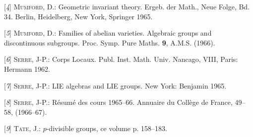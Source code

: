 [\textit{4}] \textsc{Mumford}, D.: Geometric invariant theory. Ergeb. der Math., Neue Folge, Bd. 34. Berlin, Heidelberg, New York, Springer 1965.

[\textit{5}] \textsc{Mumford}, D.: Families of abelian varieties. Algebraic groups and discontinuous subgroups. Proc. Symp. Pure Maths. \textbf{9}, A.M.S. (1966).

[\textit{6}] \textsc{Serre}, J-P.: Corps Locaux. Publ. Inst. Math. Univ. Nancago, VIII, Paris: Hermann 1962.

[\textit{7}] \textsc{Serre}, J-P.: LIE algebras and LIE groups. New York: Benjamin 1965.

[\textit{8}] \textsc{Serre}, J-P.: Résumé des cours 1965--66. Annuaire du Collège de France, 49--58, (1966--67).

[\textit{9}] \textsc{Tate}, J.: $p$-divisible groups, ce volume p. 158--183.
